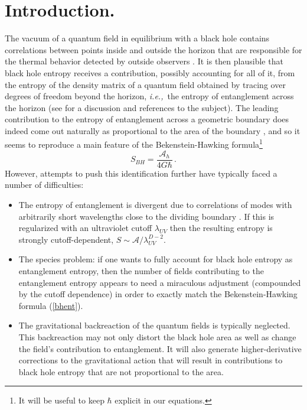 \documentclass[12pt]{article}
\newcommand{\beq}{\begin{equation}}
\newcommand{\eeq}{\end{equation}}
\newcommand{\ie}{{\it i.e.,}\ }
\newcommand{\reef}[1]{(\ref{#1})}
\begin{document}
\section{Introduction.} The vacuum of a quantum field in
equilibrium with a black hole contains correlations between points
inside and outside the horizon that are responsible for the thermal
behavior detected by outside observers \cite{unruh,israel}. It is then
plausible that black hole entropy receives a contribution, possibly
accounting for all of it, from the entropy of the density matrix of a
quantum field obtained by tracing over degrees of freedom beyond
the horizon, \ie the entropy of entanglement across the horizon
\cite{bkls} (see \cite{jac} for a discussion and references to the
subject). The leading contribution to the entropy of entanglement across
a geometric boundary does indeed come out naturally as proportional to
the area of the boundary \cite{bkls,sred}, and so it seems to reproduce
a main feature of the Bekenstein-Hawking formula\footnote{It will be
useful to keep $\hbar$ explicit in our equations.}
\beq\label{bhent}
S_{BH}=\frac{\mathcal{A}_{h}}{4G\hbar}\,. 
\eeq 
However, attempts to push this
identification further have typically faced a number of difficulties:

\begin{itemize} 

\item The entropy of entanglement is divergent due to correlations of
modes with arbitrarily short wavelengths close to the dividing boundary
\cite{bkls,thooft,sred}. If this is regularized with an ultraviolet
cutoff $\lambda_{UV}$ then the resulting entropy is strongly
cutoff-dependent, $S\sim \mathcal{A}/\lambda_{UV}^{D-2}$.

\item The species problem: if one wants to fully account for black hole
entropy as entanglement entropy, then the number of fields contributing
to the entanglement entropy appears to need a miraculous adjustment
(compounded by the cutoff dependence) in order to exactly match the
Bekenstein-Hawking formula \reef{bhent}.

\item The gravitational backreaction of the quantum fields is typically
neglected. This backreaction may not only distort the black hole area as
well as change the field's contribution to entanglement. It will also
generate higher-derivative corrections to the gravitational action that
will result in contributions to black hole entropy that are not
proportional to the area. 

\end{itemize}
\end{document}
